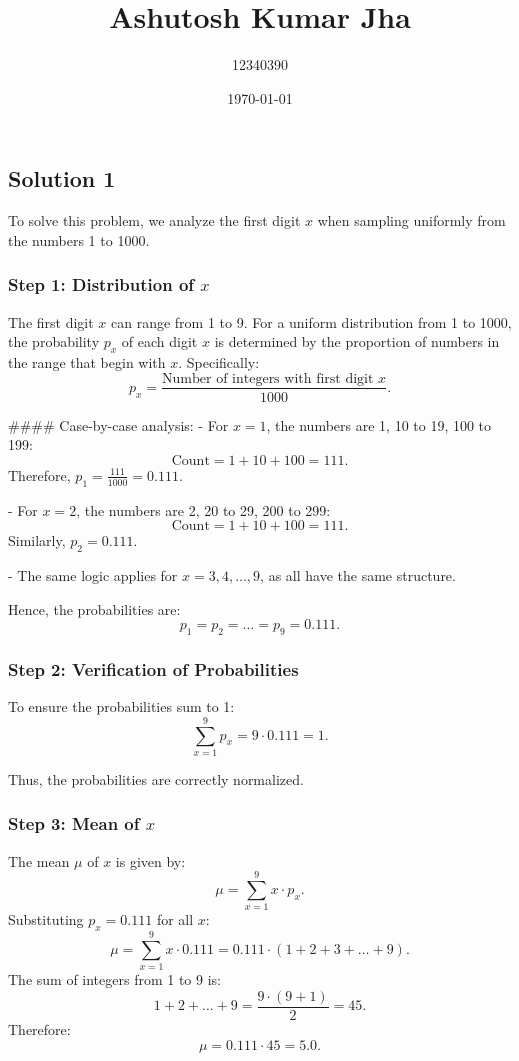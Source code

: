 \documentclass[12pt]{article}
\title{Ashutosh Kumar Jha}
\author{12340390}
\date{\today}  %
\begin{document}
\maketitle
\thispagestyle{empty}  %

\subsection*{Solution 1}

To solve this problem, we analyze the first digit \( x \) when sampling uniformly from the numbers 1 to 1000.

\subsubsection*{Step 1: Distribution of \( x \)}
The first digit \( x \) can range from 1 to 9. For a uniform distribution from 1 to 1000, the probability \( p_x \) of each digit \( x \) is determined by the proportion of numbers in the range that begin with \( x \). Specifically:
\[
p_x = \frac{\text{Number of integers with first digit } x}{1000}.
\]

#### Case-by-case analysis:
- For \( x = 1 \), the numbers are 1, 10 to 19, 100 to 199:
  \[
  \text{Count} = 1 + 10 + 100 = 111.
  \]
  Therefore, \( p_1 = \frac{111}{1000} = 0.111 \).

- For \( x = 2 \), the numbers are 2, 20 to 29, 200 to 299:
  \[
  \text{Count} = 1 + 10 + 100 = 111.
  \]
  Similarly, \( p_2 = 0.111 \).

- The same logic applies for \( x = 3, 4, \dots, 9 \), as all have the same structure.

Hence, the probabilities are:
\[
p_1 = p_2 = \dots = p_9 = 0.111.
\]

\subsubsection*{Step 2: Verification of Probabilities}
To ensure the probabilities sum to 1:
\[
\sum_{x=1}^9 p_x = 9 \cdot 0.111 = 1.
\]

Thus, the probabilities are correctly normalized.

\subsubsection*{Step 3: Mean of \( x \)}
The mean \( \mu \) of \( x \) is given by:
\[
\mu = \sum_{x=1}^9 x \cdot p_x.
\]
Substituting \( p_x = 0.111 \) for all \( x \):
\[
\mu = \sum_{x=1}^9 x \cdot 0.111 = 0.111 \cdot (1 + 2 + 3 + \dots + 9).
\]
The sum of integers from 1 to 9 is:
\[
1 + 2 + \dots + 9 = \frac{9 \cdot (9 + 1)}{2} = 45.
\]
Therefore:
\[
\mu = 0.111 \cdot 45 = 5.0.
\]
\end{document}
